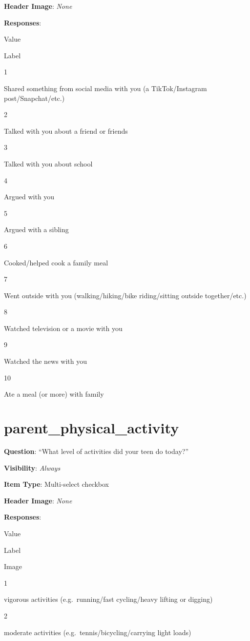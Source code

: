 \documentclass[]{book}
\begin{document}
\textbf{Header Image}: \emph{None}

\textbf{Responses}:

Value

Label

1

Shared something from social media with you (a TikTok/Instagram post/Snapchat/etc.)

2

Talked with you about a friend or friends

3

Talked with you about school

4

Argued with you

5

Argued with a sibling

6

Cooked/helped cook a family meal

7

Went outside with you (walking/hiking/bike riding/sitting outside together/etc.)

8

Watched television or a movie with you

9

Watched the news with you

10

Ate a meal (or more) with family

\hypertarget{parent_physical_activity}{%
\section{parent\_physical\_activity}\label{parent_physical_activity}}

\textbf{Question}: ``What level of activities did your teen do today?''

\textbf{Visibility}: \emph{Always}

\textbf{Item Type}: Multi-select checkbox

\textbf{Header Image}: \emph{None}

\textbf{Responses}:

Value

Label

Image

1

vigorous activities (e.g.~running/fast cycling/heavy lifting or digging)

2

moderate activities (e.g.~tennis/bicycling/carrying light loads)
\end{document}
